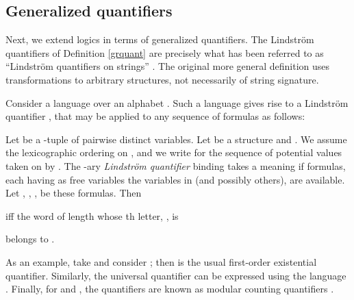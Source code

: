\documentclass{LMCS}
\begin{document}
\subsection{Generalized quantifiers}
Next, we extend logics in terms of generalized quantifiers. The Lindstr{\"o}m quantifiers of Definition \ref{grquant}
are precisely what has been referred to as ``Lindstr{\"o}m quantifiers on strings''
\cite{buvo98}. The original more general definition \cite{lin66} uses
transformations to arbitrary structures, not necessarily of string
signature.
\begin{defi}\label{grquant}
Consider a language  over an alphabet . Such a language gives rise to a Lindstr{\"o}m quantifier ,
that may be applied to any sequence of  formulas as follows:

Let  be a -tuple of pairwise distinct variables. Let   be a structure and . 
We assume the
lexicographic ordering on , and we write  for the sequence of potential values
taken on by .  The -ary \emph{Lindstr{\"o}m quantifier} 
binding  takes a meaning if  formulas, each having as
free variables the variables in  (and possibly others), are
available.  Let , , ,
 be these  formulas.  Then

 iff the word of length  whose th letter, , is

belongs to .
\end{defi}

As an example, take  and consider ; then  is the usual first-order
existential quantifier. Similarly, the universal quantifier can be
expressed using the language . Finally,  for   and  ,  the quantifiers  are known as modular counting
quantifiers \cite{str94}. 
\end{document}
